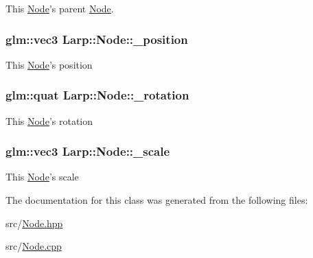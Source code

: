 This \hyperlink{classLarp_1_1Node}{Node}'s parent \hyperlink{classLarp_1_1Node}{Node}. \hypertarget{classLarp_1_1Node_a060f49eb175b70c9e0da515fa685f1f2}{
\subsubsection[{\-\_\-position}]{\setlength{\rightskip}{0pt plus 5cm}glm\-::vec3 Larp\-::\-Node\-::\-\_\-position\hspace{0.3cm}{\ttfamily [private]}}}\label{classLarp_1_1Node_a060f49eb175b70c9e0da515fa685f1f2}
This \hyperlink{classLarp_1_1Node}{Node}'s position \hypertarget{classLarp_1_1Node_a3bf60bf55c2cda89031f9327fafa0d17}{
\subsubsection[{\-\_\-rotation}]{\setlength{\rightskip}{0pt plus 5cm}glm\-::quat Larp\-::\-Node\-::\-\_\-rotation\hspace{0.3cm}{\ttfamily [private]}}}\label{classLarp_1_1Node_a3bf60bf55c2cda89031f9327fafa0d17}
This \hyperlink{classLarp_1_1Node}{Node}'s rotation \hypertarget{classLarp_1_1Node_ae295b7db9065cd5bcc1edb32af6e7987}{
\subsubsection[{\-\_\-scale}]{\setlength{\rightskip}{0pt plus 5cm}glm\-::vec3 Larp\-::\-Node\-::\-\_\-scale\hspace{0.3cm}{\ttfamily [private]}}}\label{classLarp_1_1Node_ae295b7db9065cd5bcc1edb32af6e7987}
This \hyperlink{classLarp_1_1Node}{Node}'s scale 

The documentation for this class was generated from the following files\-:\begin{DoxyCompactItemize}
\item 
src/\hyperlink{Node_8hpp}{Node.\-hpp}\item 
src/\hyperlink{Node_8cpp}{Node.\-cpp}\end{DoxyCompactItemize}
